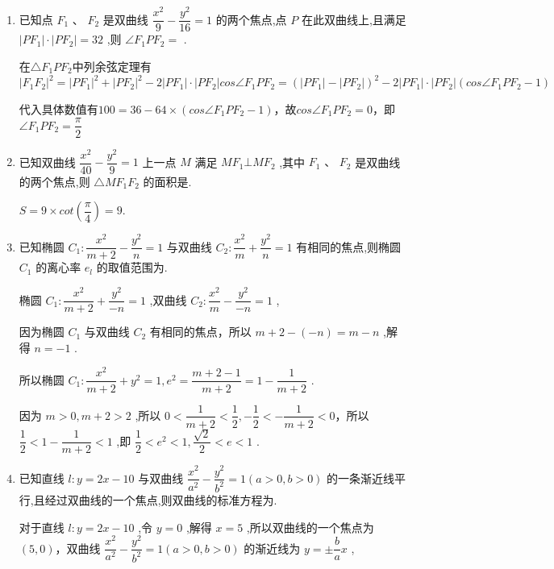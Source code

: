 \begin{enumerate}
    \item 已知点 ${F}_{1}\text{ 、 }{F}_{2}$ 是双曲线 $\dfrac{{x}^{2}}{9} - \dfrac{{y}^{2}}{16} = 1$ 的两个焦点,点 $P$ 在此双曲线上,且满足 $\left| {P{F}_{1}}\right|  \cdot  \left| {P{F}_{2}}\right|  = {32}$ ,则 $\angle {F}_{1}P{F}_{2} =$ .
    \begin{jieda}
        在$\triangle F_1PF_2$中列余弦定理有$|F_1F_2|^2 = |PF_1|^2+|PF_2|^2 - 2|PF_1|\cdot |PF_2| cos\angle {F}_{1}P{F}_{2} = \left(|PF_1|-|PF_2|\right)^2-2|PF_1|\cdot |PF_2| (cos\angle {F}_{1}P{F}_{2} - 1)$

        代入具体数值有$100 = 36 - 64 \times (cos\angle {F}_{1}P{F}_{2} - 1)$，故$cos\angle {F}_{1}P{F}_{2} = 0$，即$\angle {F}_{1}P{F}_{2} = \dfrac{\pi}{2}$
    \end{jieda}

    \item 已知双曲线 $\dfrac{{x}^{2}}{40} - \dfrac{{y}^{2}}{9} = 1$ 上一点 $M$ 满足 $M{F}_{1} \bot  M{F}_{2}$ ,其中 ${F}_{1}\text{ 、 }{F}_{2}$ 是双曲线的两个焦点,则 $\bigtriangleup  M{F}_{1}{F}_{2}$ 的面积是.
    \begin{jieda}
        $S = 9 \times cot\left(\dfrac{\pi}{4}\right) = 9$.
    \end{jieda}

    \item 已知椭圆 ${C}_{1} : \dfrac{{x}^{2}}{m + 2} - \dfrac{{y}^{2}}{n} = 1$ 与双曲线 ${C}_{2} : \dfrac{{x}^{2}}{m} + \dfrac{{y}^{2}}{n} = 1$ 有相同的焦点,则椭圆 ${C}_{1}$ 的离心率 ${e}_{l}$ 的取值范围为.
    \begin{jieda}
        椭圆 ${C}_{1} : \dfrac{{x}^{2}}{m + 2} + \dfrac{{y}^{2}}{-n} = 1$ ,双曲线 ${C}_{2} : \dfrac{{x}^{2}}{m} - \dfrac{{y}^{2}}{-n} = 1$ ,
        
        因为椭圆 ${C}_{1}$ 与双曲线 ${C}_{2}$ 有相同的焦点，所以 $m + 2 - \left( {-n}\right)  = m - n$ ,解得 $n =  - 1$ .
        
        所以椭圆 ${C}_{1} : \dfrac{{x}^{2}}{m + 2} + {y}^{2} = 1,{e}^{2} = \dfrac{m + 2 - 1}{m + 2} = 1 - \dfrac{1}{m + 2}$ .
        
        因为 $m > 0,m + 2 > 2$ ,所以 $0 < \dfrac{1}{m + 2} < \dfrac{1}{2}, - \dfrac{1}{2} <  - \dfrac{1}{m + 2} < 0$，所以 $\dfrac{1}{2} < 1 - \dfrac{1}{m + 2} < 1$ ,即 $\dfrac{1}{2} < {e}^{2} < 1,\dfrac{\sqrt{2}}{2} < e < 1$ .

    \end{jieda}

    \item 已知直线 $l : y = {2x} - {10}$ 与双曲线 $\dfrac{{x}^{2}}{{a}^{2}} - \dfrac{{y}^{2}}{{b}^{2}} = 1\left( {a > 0,b > 0}\right)$ 的一条渐近线平行,且经过双曲线的一个焦点,则双曲线的标准方程为.
    \begin{jieda}
        对于直线 $l : y = {2x} - {10}$ ,令 $y = 0$ ,解得 $x = 5$ ,所以双曲线的一个焦点为$(5,0)$，双曲线 $\dfrac{{x}^{2}}{{a}^{2}} - \dfrac{{y}^{2}}{{b}^{2}} = 1\left( {a > 0,b > 0}\right)$ 的渐近线为 $y =  \pm  \dfrac{b}{a}x$ ,
        

\end{jieda}
\end{enumerate}
